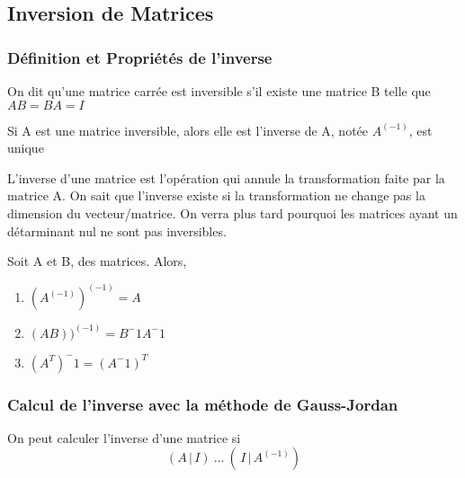 \documentclass{article}
\begin{document}
\subsection{Inversion de Matrices}

\subsubsection{Définition et Propriétés de l'inverse}

\begin{definition}
    On dit qu'une matrice carrée est inversible s'il existe une matrice B
    telle que $AB=BA=I$
\end{definition}

\begin{theorem}
    Si A est une matrice inversible, alors elle est l'inverse de A, notée
    $A^(-1)$, est unique
\end{theorem}

\begin{remark}
    L'inverse d'une matrice est l'opération qui annule la transformation
    faite par la matrice A. On sait que l'inverse existe si la
    transformation ne change pas la dimension du vecteur/matrice. On
    verra plus tard pourquoi les matrices ayant un détarminant nul ne
    sont pas inversibles.
\end{remark}

\begin{theorem}
    Soit A et B, des matrices. Alors,
    \begin{enumerate}
	\item $ (A^(-1))^(-1) = A$
	\item $ (AB))^(-1) = B^-1 A^-1$
	\item $ (A^T)^-1 = (A^-1)^T$
    \end{enumerate}

\end{theorem}

\subsubsection{Calcul de l'inverse avec la méthode de Gauss-Jordan}

\begin{definition}
    On peut calculer l'inverse d'une matrice si $$ (A \, | \, I) ~ ...
    ~ (\, I \, | \, A^(-1))$$
\end{definition}
\end{document}
